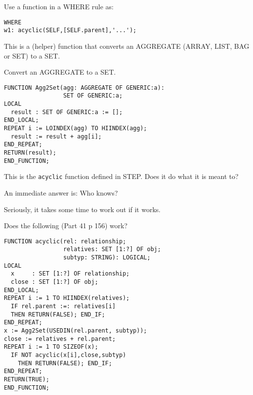     Use a function in a WHERE rule as:
\begin{verbatim}
WHERE
w1: acyclic(SELF,[SELF.parent],'...');
\end{verbatim}


\begin{remarks}
\remintro
{}

This is a (helper) function that converts an AGGREGATE 
(ARRAY, LIST, BAG or SET) to a SET.

\remend
\end{remarks}

\clearpage

    Convert an AGGREGATE to a SET.
\begin{verbatim}
FUNCTION Agg2Set(agg: AGGREGATE OF GENERIC:a):
                 SET OF GENERIC:a;
LOCAL
  result : SET OF GENERIC:a := [];
END_LOCAL;
REPEAT i := LOINDEX(agg) TO HIINDEX(agg);
  result := result + agg[i];
END_REPEAT;
RETURN(result);
END_FUNCTION;
\end{verbatim}

\begin{remarks}
\remintro
{}

This is the \texttt{acyclic} function defined in STEP. Does it do
what it is meant to? 

An immediate answer is: Who knows?

Seriously, it takes some time to work out if it works.

\remend
\end{remarks}

\clearpage

Does the following (Part 41 p 156) work?
\begin{verbatim}
FUNCTION acyclic(rel: relationship;
                 relatives: SET [1:?] OF obj;
                 subtyp: STRING): LOGICAL;
LOCAL
  x     : SET [1:?] OF relationship;
  close : SET [1:?] OF obj;
END_LOCAL;
REPEAT i := 1 TO HIINDEX(relatives);
  IF rel.parent :=: relatives[i]
  THEN RETURN(FALSE); END_IF;
END_REPEAT;
x := Agg2Set(USEDIN(rel.parent, subtyp));
close := relatives + rel.parent;
REPEAT i := 1 TO SIZEOF(x);
  IF NOT acyclic(x[i],close,subtyp)
    THEN RETURN(FALSE); END_IF;
END_REPEAT;
RETURN(TRUE);
END_FUNCTION;
\end{verbatim}

